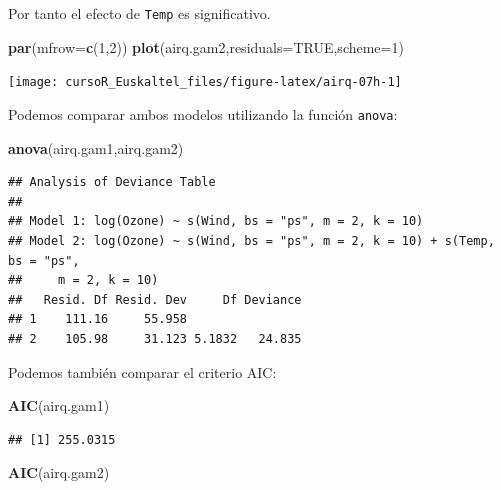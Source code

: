 \documentclass[]{book}
\newenvironment{Shaded}{\begin{snugshade}}{\end{snugshade}}
\newcommand{\KeywordTok}[1]{\textcolor[rgb]{0.13,0.29,0.53}{\textbf{#1}}}
\newcommand{\DataTypeTok}[1]{\textcolor[rgb]{0.13,0.29,0.53}{#1}}
\newcommand{\DecValTok}[1]{\textcolor[rgb]{0.00,0.00,0.81}{#1}}
\newcommand{\OtherTok}[1]{\textcolor[rgb]{0.56,0.35,0.01}{#1}}
\newcommand{\NormalTok}[1]{#1}
\begin{document}
Por tanto el efecto de \texttt{Temp} es significativo.

\begin{Shaded}
\begin{Highlighting}[]
\KeywordTok{par}\NormalTok{(}\DataTypeTok{mfrow=}\KeywordTok{c}\NormalTok{(}\DecValTok{1}\NormalTok{,}\DecValTok{2}\NormalTok{))}
\KeywordTok{plot}\NormalTok{(airq.gam2,}\DataTypeTok{residuals=}\OtherTok{TRUE}\NormalTok{,}\DataTypeTok{scheme=}\DecValTok{1}\NormalTok{)}
\end{Highlighting}
\end{Shaded}

\begin{center}\texttt{[image: cursoR\_Euskaltel\_files/figure-latex/airq-07h-1]} \end{center}

Podemos comparar ambos modelos utilizando la función \texttt{anova}:

\begin{Shaded}
\begin{Highlighting}[]
\KeywordTok{anova}\NormalTok{(airq.gam1,airq.gam2)}
\end{Highlighting}
\end{Shaded}

\begin{verbatim}
## Analysis of Deviance Table
## 
## Model 1: log(Ozone) ~ s(Wind, bs = "ps", m = 2, k = 10)
## Model 2: log(Ozone) ~ s(Wind, bs = "ps", m = 2, k = 10) + s(Temp, bs = "ps", 
##     m = 2, k = 10)
##   Resid. Df Resid. Dev     Df Deviance
## 1    111.16     55.958                
## 2    105.98     31.123 5.1832   24.835
\end{verbatim}

Podemos también comparar el criterio AIC:

\begin{Shaded}
\begin{Highlighting}[]
\KeywordTok{AIC}\NormalTok{(airq.gam1)}
\end{Highlighting}
\end{Shaded}

\begin{verbatim}
## [1] 255.0315
\end{verbatim}

\begin{Shaded}
\begin{Highlighting}[]
\KeywordTok{AIC}\NormalTok{(airq.gam2)}
\end{Highlighting}
\end{Shaded}
\end{document}

